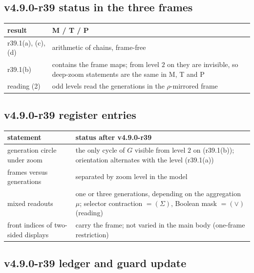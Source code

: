 \subsection*{v4.9.0-r39 status in the three frames}
\label{subsec:v490-r39-frames}

\begin{center}
\small
\begin{tabular}{@{}>{\raggedright\arraybackslash}p{}>{\raggedright\arraybackslash}p{}@{}}
\toprule
result & M / T / P\\
\midrule
r39.1(a), (c), (d) & arithmetic of chains, frame-free\\
r39.1(b) & contains the frame maps; from level \(2\) on they are invisible, so deep-zoom statements are the same in M, T and P\\
reading (2) & odd levels read the generations in the \(\rho\)-mirrored frame\\
\bottomrule
\end{tabular}
\end{center}

\subsection*{v4.9.0-r39 register entries}
\label{subsec:v490-r39-register}

\begin{center}
\small
\begin{tabular}{@{}>{\raggedright\arraybackslash}p{}>{\raggedright\arraybackslash}p{}@{}}
\toprule
statement & status after v4.9.0-r39\\
\midrule
generation circle under zoom & the only cycle of \(G\) visible from level \(2\) on (r39.1(b)); orientation alternates with the level (r39.1(a))\\
frames versus generations & separated by zoom level in the model\\
mixed readouts & one or three generations, depending on the aggregation \(\mu\); selector contraction \(=(\Sigma)\), Boolean mask \(=(\vee)\) (reading)\\
front indices of two-sided displays & carry the frame; not varied in the main body (one-frame restriction)\\
\bottomrule
\end{tabular}
\end{center}

\subsection*{v4.9.0-r39 ledger and guard update}
\label{subsec:v490-r39-ledger-guard}

